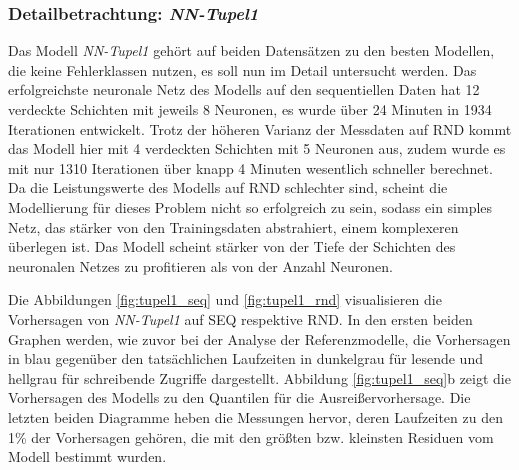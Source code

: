 \documentclass[
	twoside,
	12pt,
	a4paper,
	BCOR10mm,
	DIV14,
	listof=totoc,
	bibliography=totoc,
	headsepline
]{scrreprt}
\begin{document}
\subsubsection{Detailbetrachtung: \textit{NN-Tupel1}}
Das Modell \textit{NN-Tupel1} gehört auf beiden Datensätzen zu den besten Modellen, die keine Fehlerklassen nutzen, es soll nun im Detail untersucht werden.
Das erfolgreichste neuronale Netz des Modells auf den sequentiellen Daten hat 12 verdeckte Schichten mit jeweils 8 Neuronen, es wurde über 24 Minuten in 1934 Iterationen entwickelt.
Trotz der höheren Varianz der Messdaten auf RND kommt das Modell hier mit 4 verdeckten Schichten mit 5 Neuronen aus, zudem wurde es mit nur 1310 Iterationen über knapp 4 Minuten wesentlich schneller berechnet.
Da die Leistungswerte des Modells auf RND schlechter sind, scheint die Modellierung für dieses Problem nicht so erfolgreich zu sein, sodass ein simples Netz, das stärker von den Trainingsdaten abstrahiert, einem komplexeren überlegen ist.
Das Modell scheint stärker von der Tiefe der Schichten des neuronalen Netzes zu profitieren als von der Anzahl Neuronen.\medskip

Die Abbildungen \ref{fig:tupel1_seq} und \ref{fig:tupel1_rnd} visualisieren die Vorhersagen von \textit{NN-Tupel1} auf SEQ respektive RND.
In den ersten beiden Graphen werden, wie zuvor bei der Analyse der Referenzmodelle, die Vorhersagen in blau gegenüber den tatsächlichen Laufzeiten in dunkelgrau für lesende und hellgrau für schreibende Zugriffe dargestellt.
Abbildung \ref{fig:tupel1_seq}b zeigt die Vorhersagen des Modells zu den Quantilen für die Ausreißervorhersage.
Die letzten beiden Diagramme heben die Messungen hervor, deren Laufzeiten zu den 1\% der Vorhersagen gehören, die mit den größten bzw. kleinsten Residuen vom Modell bestimmt wurden.\medskip
\end{document}
